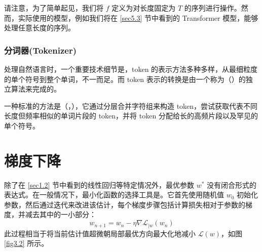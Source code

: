 请注意，为了简单起见，我们将 $f$ 定义为对长度固定为 $T$ 的序列进行操作。然而，实际使用的模型，例如我们将在 \ref{sec5.3} 节中看到的 Transformer 模型，能够处理任意长度的序列。

\subsubsection*{分词器(Tokenizer)}

处理自然语言时，一个重要技术细节是，token 的表示方法多种多样，从最细粒度的单个符号到整个单词，不一而足。而 token 表示的转换是由一个称为（）的独立算法来完成的。

一种标准的方法是（，）\citep{srivastava14a}，它通过分层合并字符组来构造 token，尝试获取代表不同长度但频率相似的单词片段的 token，并将 token 分配给长的高频片段以及罕见的单个符号。

\section{梯度下降}\label{sec3.3}

除了在 \ref{sec1.2} 节中看到的线性回归等特定情况外，最优参数 $w^*$ 没有闭合形式的表达式。在一般情况下，最小化函数的选择工具是。它首先使用随机值 $w_0$ 初始化参数，然后通过迭代来改进该估计，每个梯度步骤包括计算损失相对于参数的梯度，并减去其中的一小部分：
\begin{equation}
    w_{n+1} = w_n - \eta \nabla \mathcal{L}_{\mid w}(w_n)\label{eq3.1}
\end{equation}
此过程相当于将当前估计值超微朝局部最优方向最大化地减小 $\mathcal{L}(w)$，如图 \ref{fig3.2} 所示。

